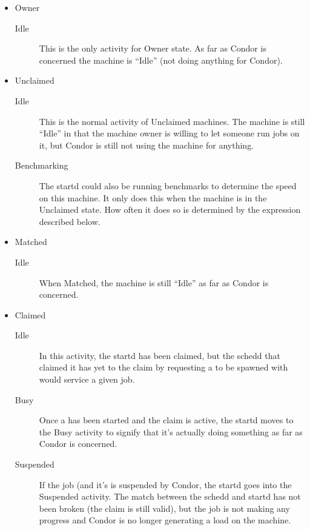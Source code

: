 \begin{itemize}

\item Owner
\begin{description}
\item[Idle] This is the only activity for Owner state.  As far as
  Condor is concerned the machine is ``Idle'' (not doing anything for
  Condor).
\end{description}

\item Unclaimed
\begin{description}
  
\item[Idle] This is the normal activity of Unclaimed machines.  The
  machine is still ``Idle'' in that the machine owner is willing to
  let someone run jobs on it, but Condor is still not using the
  machine for anything.
  
\item[Benchmarking] The startd could also be running benchmarks to
  determine the speed on this machine.  It only does this when the
  machine is in the Unclaimed state.  How often it does so is
  determined by the  expression described below.

\end{description}

\item Matched
\begin{description}
\item[Idle] When Matched, the machine is still ``Idle'' as far as
  Condor is concerned.
\end{description}

\item Claimed
\begin{description}
  
\item[Idle] In this activity, the startd has been claimed, but the
  schedd that claimed it has yet to  the claim by
  requesting a  to be spawned with would service a
  given job.
  
\item[Busy] Once a  has been started and the claim is
  active, the startd moves to the Busy activity to signify that it's
  actually doing something as far as Condor is concerned.
  
\item[Suspended] If the job (and it's  is suspended by
  Condor, the startd goes into the Suspended activity.  The match
  between the schedd and startd has not been broken (the claim is
  still valid), but the job is not making any progress and Condor is
  no longer generating a load on the machine.


\end{description}
\end{itemize}
